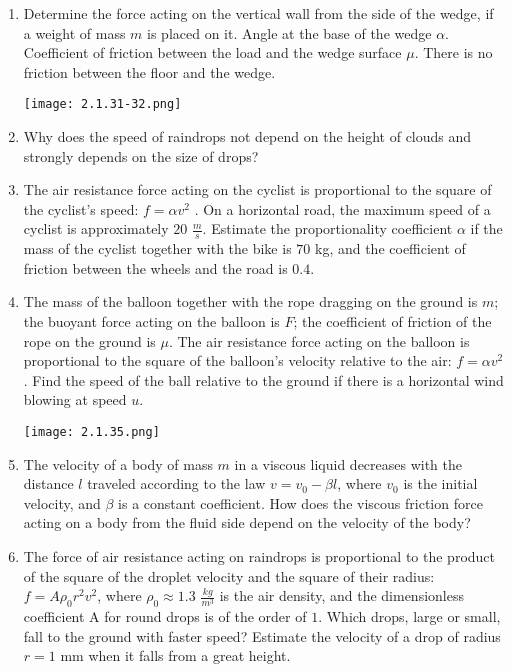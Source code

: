 \documentclass{article}
\begin{document}
\begin{enumerate}[label=2.1.\arabic*]
\item Determine the force acting on the vertical wall from the side of the wedge, if a weight of mass $m$ is placed on it. Angle at the base of the wedge $\alpha$. Coefficient of friction between the load and the wedge surface $\mu$. There is no friction between the floor and the wedge.

\begin{center}
    \texttt{[image: 2.1.31-32.png]}
\end{center}

\item Why does the speed of raindrops not depend on the height of clouds and strongly depends on the size of drops?

\item The air resistance force acting on the cyclist is proportional to the square of the cyclist's speed: $f = \alpha v^2$ . On a horizontal road, the maximum speed of a cyclist is approximately $20$ $\frac{m}{s}$. Estimate the proportionality coefficient $\alpha$ if the mass of the cyclist together with the bike is $70$ kg, and the coefficient of friction between the wheels and the road is $0.4$.

\item The mass of the balloon together with the rope dragging on the ground is $m$; the buoyant force acting on the balloon is $F$; the coefficient of friction of the rope on the ground is $\mu$. The air resistance force acting on the balloon is proportional to the square of the balloon's velocity relative to the air: $f = \alpha v^2$ . Find the speed of the ball relative to the ground if there is a horizontal wind blowing at speed $u$.

\begin{center}
    \texttt{[image: 2.1.35.png]}
\end{center}

\item The velocity of a body of mass $m$ in a viscous liquid decreases with the distance $l$ traveled according to the law $v = v_0 - \beta l$, where $v_0$ is the initial velocity, and $\beta$ is a constant coefficient. How does the viscous friction force acting on a body from the fluid side depend on the velocity of the body?

\item The force of air resistance acting on raindrops is proportional to the product of the square of the droplet velocity and the square of their radius: $f = A \rho_0 r^2 v^2$, where $\rho_0 \approx 1.3$ $\frac{kg}{m^3}$ is the air density, and the dimensionless coefficient A for round drops is of the order of $1$. Which drops, large or small, fall to the ground with faster speed? Estimate the velocity of a drop of radius $r = 1$ mm when it falls from a great height.


\end{enumerate}
\end{document}
